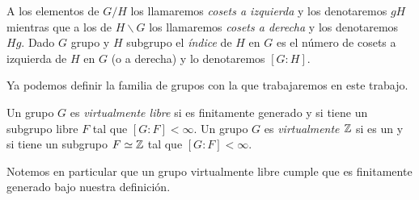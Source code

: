 \documentclass[tesis.tex]{subfiles}
\begin{document}
A los elementos de $G/H$ los llamaremos \emph{cosets a izquierda} y los denotaremos $gH$ mientras que a los de $H \backslash G$ los llamaremos \emph{cosets a derecha} y los denotaremos $Hg$.
Dado $G$ grupo y $H$ subgrupo el \emph{índice} de $H$ en $G$ es el número de cosets a izquierda de $H$ en $G$ (o a derecha) y lo denotaremos $[G:H]$.


Ya podemos definir la familia de grupos con la que trabajaremos en este trabajo.

\begin{deff}
	Un grupo $G$ es \emph{virtualmente libre} si es finitamente generado y si
	tiene un subgrupo libre $F$ tal que $[G:F] < \infty$.
	Un grupo $G$ es \emph{virtualmente $\mathbb{Z}$} si es un \fg y si tiene un subgrupo $F \simeq \mathbb{Z}$ tal que $[G:F] < \infty$. 
\end{deff}

Notemos en particular que un grupo virtualmente libre cumple que es finitamente generado bajo nuestra definición.
\end{document}
